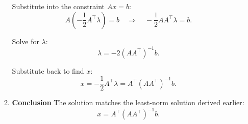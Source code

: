 \begin{derivation}
\begin{enumerate}
\begin{enumerate}
            Substitute into the constraint \(A x = b\):
            \[
            A \left(-\frac{1}{2} A^\top \lambda \right) = b \quad \Rightarrow \quad -\frac{1}{2} A A^\top \lambda = b.
            \]
            
            Solve for \(\lambda\):
            \[
            \lambda = -2 (A A^\top)^{-1} b.
            \]
            
            Substitute back to find \(x\):
            \[
            x = -\frac{1}{2} A^\top \lambda = A^\top (A A^\top)^{-1} b.
            \]
            
            \item \textbf{Conclusion} The solution matches the least-norm solution derived earlier:
            \[
            x = A^\top (A A^\top)^{-1} b.
            \]
        \end{enumerate}
        
    \end{enumerate}
\end{derivation}

